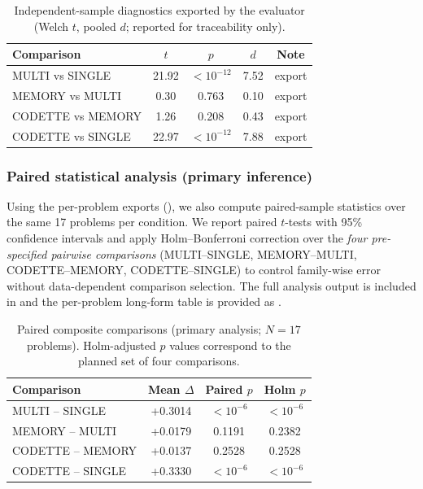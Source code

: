 \documentclass[11pt,a4paper]{article}
\begin{document}
\begin{table}[ht]
\centering
\caption{Independent-sample diagnostics exported by the evaluator (Welch $t$, pooled $d$; reported for traceability only).}
\label{tab:welch-stats}
\begin{tabular}{lcccc}
\toprule
\textbf{Comparison} & \textbf{$t$} & \textbf{$p$} & \textbf{$d$} & \textbf{Note} \\
\midrule
MULTI vs SINGLE   & 21.92 & $<10^{-12}$ & 7.52 & export \\
MEMORY vs MULTI   & 0.30  & 0.763 & 0.10 & export \\
CODETTE vs MEMORY & 1.26  & 0.208 & 0.43 & export \\
CODETTE vs SINGLE & 22.97 & $<10^{-12}$ & 7.88 & export \\
\bottomrule
\end{tabular}
\end{table}

\subsubsection{Paired statistical analysis (primary inference)}
Using the per-problem exports (), we also compute paired-sample statistics over the same 17 problems per condition. We report paired $t$-tests with 95\% confidence intervals and apply Holm--Bonferroni correction over the \emph{four pre-specified pairwise comparisons} (MULTI--SINGLE, MEMORY--MULTI, CODETTE--MEMORY, CODETTE--SINGLE) to control family-wise error without data-dependent comparison selection. The full analysis output is included in  and the per-problem long-form table is provided as .

\begin{table}[ht]
\centering
\caption{Paired composite comparisons (primary analysis; $N=17$ problems). Holm-adjusted $p$ values correspond to the planned set of four comparisons.}
\label{tab:paired-stats}
\begin{tabular}{lccc}
\toprule
\textbf{Comparison} & \textbf{Mean $\Delta$} & \textbf{Paired $p$} & \textbf{Holm $p$} \\
\midrule
MULTI -- SINGLE   & +0.3014 & $<10^{-6}$ & $<10^{-6}$ \\
MEMORY -- MULTI   & +0.0179 & 0.1191 & 0.2382 \\
CODETTE -- MEMORY & +0.0137 & 0.2528 & 0.2528 \\
CODETTE -- SINGLE & +0.3330 & $<10^{-6}$ & $<10^{-6}$ \\
\bottomrule
\end{tabular}
\end{table}
\end{document}
